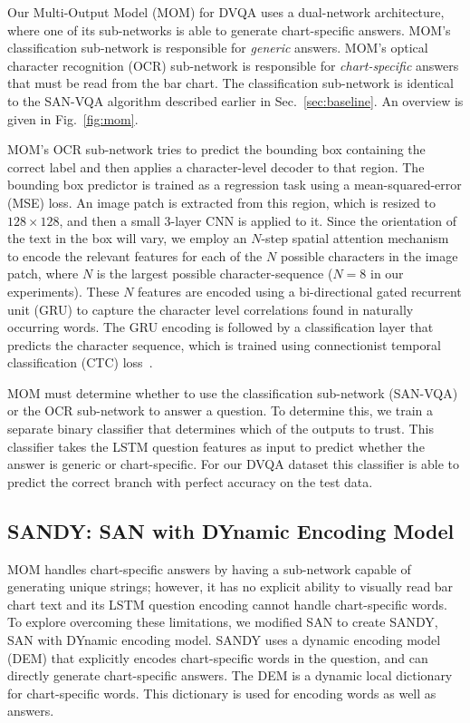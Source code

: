 \documentclass[10pt,twocolumn,letterpaper]{article}
\begin{document}
Our Multi-Output Model (MOM) for DVQA uses a dual-network architecture, where one of its sub-networks is able to generate chart-specific answers. MOM's classification sub-network is responsible for \textit{generic} answers. MOM's optical character recognition (OCR) sub-network is responsible for \textit{chart-specific} answers that must be read from the bar chart. The classification sub-network is identical to the SAN-VQA algorithm described earlier in Sec.~\ref{sec:baseline}. An overview is given in Fig.~\ref{fig:mom}.

MOM's OCR sub-network tries to predict the bounding box  containing the correct label and then applies a character-level decoder to that region. The bounding box predictor is trained as a regression task using a mean-squared-error (MSE) loss. An image patch is extracted from this region, which is resized to $128\times128$, and then a small 3-layer CNN is applied to it. Since the orientation of the text in the box will vary, we employ an $N$-step spatial attention mechanism to encode the relevant features for each of the $N$ possible characters in the image patch, where $N$ is the largest possible character-sequence ($N=8$ in our experiments). These $N$ features are encoded using a bi-directional gated recurrent unit (GRU) to capture the character level correlations found in naturally occurring words. The GRU encoding is followed by a classification layer that predicts the character sequence, which is trained using connectionist temporal classification (CTC) loss~\cite{graves2006-ctc}.

MOM must determine whether to use the classification sub-network (\ie SAN-VQA) or the OCR sub-network to answer a question. To determine this, we train a separate binary classifier that determines which of the outputs to trust. This classifier takes the LSTM question features as input to predict whether the answer is generic or chart-specific. For our DVQA dataset this classifier is able to predict the correct branch with perfect accuracy on the test data.

\subsection{SANDY: SAN with DYnamic Encoding Model}

MOM handles chart-specific answers by having a sub-network capable of generating unique strings; however, it has no explicit ability to visually read bar chart text and its LSTM question encoding cannot handle chart-specific words. To explore overcoming these limitations, we modified SAN to create SANDY, SAN with DYnamic encoding model. SANDY uses a dynamic encoding model (DEM) that explicitly encodes chart-specific words in the question, and can directly generate chart-specific answers.  The DEM is a  dynamic local dictionary for chart-specific words. This dictionary is used for encoding words as well as answers. 
\end{document}

